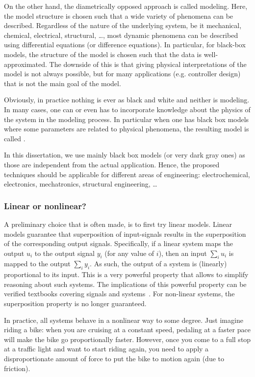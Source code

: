 On the other hand, the diametrically opposed approach is called  modeling.
Here, the model structure is chosen such that a wide variety of phenomena can be described.
Regardless of the nature of the underlying system, be it mechanical, chemical, electrical, structural, \ldots, most dynamic phenomena can be described using differential equations (or difference equations).
In particular, for black-box models, the structure of the model is chosen such that the data is well-approximated.
The downside of this is that giving physical interpretations of the model is not always possible, but for many applications (e.g. controller design) that is not the main goal of the model.

Obviously, in practice nothing is ever as black and white and neither is modeling.
In many cases, one can or even has to incorporate knowledge about the physics of the system in the modeling process.
In particular when one has black box models where some parameters are related to physical phenomena, the resulting model is called .

In this dissertation, we use mainly black box models (or very dark gray ones) as those are independent from the actual application.
Hence, the proposed techniques should be applicable for different areas of engineering: electrochemical, electronics, mechatronics, structural engineering, \ldots

\subsubsection{Linear or nonlinear?}
A preliminary choice that is often made, is to first try linear models.
Linear models guarantee that superposition of input-signals results in the superposition of the corresponding output signals.
Specifically, if a linear system maps the output $u_i$ to the output signal $y_i$ (for any value of $i$), then an input $\sum_i u_i$ is mapped to the output $\sum_i y_i$.
As such, the output of a system is (linearly) proportional to its input.
This is a very powerful property that allows to simplify reasoning about such systems.
The implications of this powerful property can be verified textbooks covering signals and systems~\citep{Oppenheim1996,Mandal2007,Kailath1980}.
For non-linear systems, the superposition property is no longer guaranteed.

In practice, all systems behave in a nonlinear way to some degree.
Just imagine riding a bike: when you are cruising at a constant speed, pedaling at a faster pace will make the bike go proportionally faster.
However, once you come to a full stop at a traffic light and want to start riding again, you need to apply a disproportionate amount of force to put the bike to motion again (due to friction).

